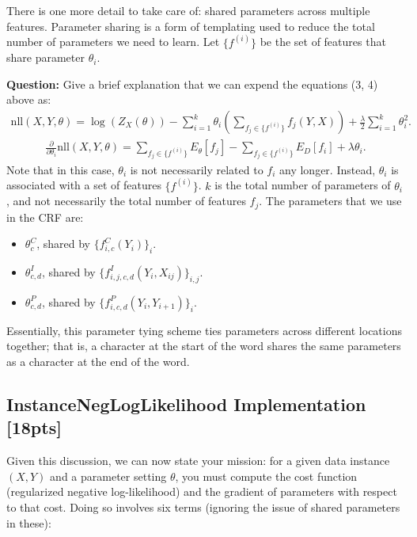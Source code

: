 There is one more detail to take care of: shared parameters across multiple features. Parameter sharing is a form of templating used to reduce the total number of parameters we need to learn. Let $\{f^{(i)}  \}$ be the set of features that share parameter $\theta_i$. 

\textbf{Question: }Give a brief explanation that we can expend the equations (3, 4) above as:
\begin{align}
\text{nll} (X, Y, \theta) = \log ( Z_X (\theta) ) - \sum_{i=1}^{k} \theta_i (  \sum_{f_j \in \{ f^{(i)} \} }  f_j (Y, X ) ) + \frac{\lambda}{2} \sum_{i = 1}^k \theta_i^2.
\end{align}
\begin{align}
\frac{\partial }{\partial \theta_i} \text{nll} (X, Y, \theta) =  \sum_{ f_j \in \{ f^{(i)}   \}   } E_{\theta} [ f_j ] - \sum_{  f_j \in \{ f^{(i)}  \}  }  E_D [ f_i] + \lambda \theta_i.
\end{align}
Note that in this case, $\theta_i$ is not necessarily related to $f_i$ any longer. Instead, $\theta_i$ is associated with a set of features $\{ f^{  (i)  }  \}$. $k$ is the total number of parameters of $\theta_i$, and not necessarily the total number of features $f_j$. The parameters that we use in the CRF are:
\begin{itemize}
\item $\theta_c^C$, shared by $ \{  f_{i,c}^C (  Y_i  )    \}_i   $.

\item $\theta_{c,d}^I$, shared by $ \{   f_{i,j,c,d}^I  (  Y_{i}, X_{ij}   )          \}_{i,j}       $.


\item $\theta_{c,d}^P$, shared by $ \{   f_{i,c,d}^P (Y_i, Y_{i+1})      \}_i  $.
\end{itemize}
Essentially, this parameter tying scheme ties parameters across different locations together; that is, a character at the start of the word shares the same parameters as a character at the end of the word.


\subsection{InstanceNegLogLikelihood Implementation [18pts]}

Given this discussion, we can now state your mission: for a given data instance $(X,Y)$ and a parameter setting $\theta$, you must compute the cost function (regularized negative log-likelihood) and the gradient of parameters with respect to that cost. Doing so involves six terms (ignoring the issue of shared parameters in these):

